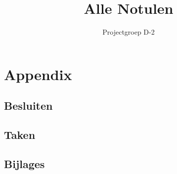 \documentclass{report}
\title{Alle Notulen}
\author{Projectgroep D-2}
\begin{document}
\maketitle
\tableofcontents


 \appendix
 \chapter{Appendix}
 \section{Besluiten}\listofdecisions
 \section{Taken}\listoftasks
 \section{Bijlages}\listofattachments
\end{document}
